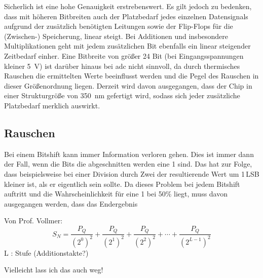 Sicherlich ist eine hohe Genauigkeit erstrebenswert. Es gilt jedoch zu bedenken, dass mit höheren Bitbreiten auch der Platzbedarf jedes einzelnen Datensignals aufgrund der 
zusätzlich benötigten Leitungen sowie der Flip-Flops für die (Zwischen-) Speicherung, linear steigt. 
Bei Additionen und insbesondere Multiplikationen geht mit jedem zusätzlichen Bit ebenfalls ein linear steigender Zeitbedarf einher.
Eine Bitbreite von größer 24 Bit (bei Eingangsspannungen kleiner \SI{5}{V}) ist darüber hinaus bei \gls{adc} nicht sinnvoll, da durch thermisches Rauschen die ermittelten 
Werte beeinflusst werden und die Pegel des Rauschen in dieser Größenordnung liegen.
Derzeit wird davon ausgegangen, dass der Chip in einer Strukturgröße von \SI{350}{nm} gefertigt wird, sodass sich jeder zusätzliche Platzbedarf merklich auswirkt.


 
\subsection{Rauschen}
Bei einem Bitshift kann immer Information verloren gehen. Dies ist immer dann der Fall, wenn die Bits die abgeschnitten werden eine 1 sind. Das hat zur Folge, dass beispielsweise
bei einer Division durch Zwei der resultierende Wert um 1\,LSB kleiner ist, als er eigentlich sein sollte. 
Da dieses Problem bei jedem Bitshift auftritt und die Wahrscheinlichkeit für eine 1 bei 50$\%$ liegt, muss davon ausgegangen werden, dass das Endergebnis 


Von Prof. Vollmer: 
\begin{equation}
 S_N = \frac{P_Q}{\left(2^0\right)^2} + \frac{P_Q}{\left(2^1\right)^2} + \frac{P_Q}{\left(2^2\right)^2} + \cdots + \frac{P_Q}{\left(2^{L-1}\right)^2}
\end{equation}
L : Stufe (Additionstakte?)

Vielleicht lass ich das auch weg!
